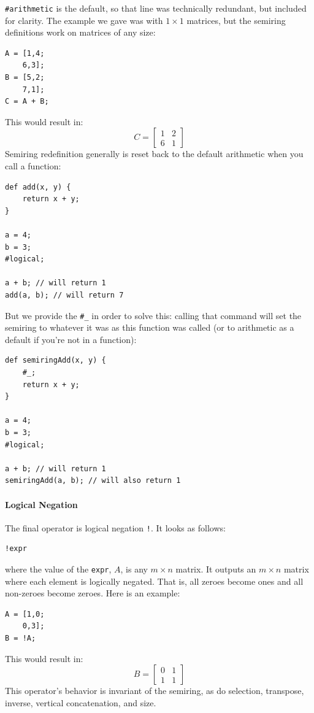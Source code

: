 \verb=#arithmetic= is the default, so that line was technically redundant, but included for clarity.
The example we gave was with $1\times1$ matrices, but the semiring definitions work on matrices of any size:

\begin{lstlisting}
A = [1,4;
    6,3];
B = [5,2;
    7,1];
C = A + B;
\end{lstlisting}
This would result in:
$$C=\begin{bmatrix}
1&2\\
6&1
\end{bmatrix}$$
Semiring redefinition generally is reset back to the default arithmetic when you call a function:
\begin{lstlisting}
def add(x, y) {
    return x + y;
}

a = 4;
b = 3;
#logical;

a + b; // will return 1
add(a, b); // will return 7
\end{lstlisting}
But we provide the \verb=#_= in order to solve this: calling that command will set the semiring to whatever it was as this function was called (or to arithmetic as a default if you're not in a function):
\begin{lstlisting}
def semiringAdd(x, y) {
    #_;
    return x + y;
}

a = 4;
b = 3;
#logical;

a + b; // will return 1
semiringAdd(a, b); // will also return 1
\end{lstlisting}

\paragraph{Logical Negation}
The final operator is logical negation \verb=!=.  It looks as follows:
\begin{lstlisting}
!expr
\end{lstlisting}
where the value of the \verb=expr=, $A$, is any $m \times n$ matrix.  It outputs an $m \times n$ matrix where each element is logically negated.  That is, all zeroes become ones and all non-zeroes become zeroes.  Here is an example:

\begin{lstlisting}
A = [1,0;
    0,3];
B = !A;
\end{lstlisting}
This would result in:
$$B=\begin{bmatrix}
0 & 1\\
1 & 1
\end{bmatrix}$$
This operator's behavior is invariant of the semiring, as do selection, transpose, inverse, vertical concatenation, and size.

